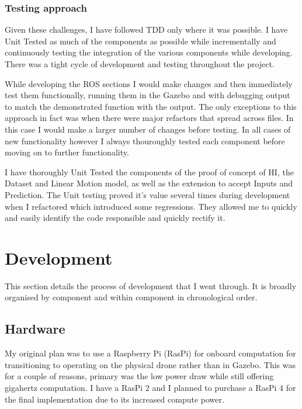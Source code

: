 \documentclass[]{../resources/final_report}
\begin{document}
\subsubsection{Testing approach}

Given these challenges, I have followed TDD only where it was possible. I have Unit Tested as much of the components as possible while incrementally and continuously testing the integration of the various components while developing. There was a tight cycle of development and testing throughout the project.

While developing the ROS sections I would make changes and then immediately test them functionally, running them in the Gazebo and with debugging output to match the demonstrated function with the output.
The only exceptions to this approach in fact was when there were major refactors that spread across files. In this case I would make a larger number of changes before testing. In all cases of new functionality however I always thouroughly tested each component before moving on to further functionality.

I have thoroughly Unit Tested the components of the proof of concept of HI, the Dataset and Linear Motion model, as well as the extension to accept Inputs and Prediction. The Unit testing proved it's value several times during development when I refactored which introduced some regressions. They allowed me to quickly and easily identify the code responsible and quickly rectify it.

\section{Development}

This section details the process of development that I went through. It is broadly organised by component and within component in chronological order.

\subsection{Hardware}

My original plan was to use a Raspberry Pi (RasPi) for onboard computation for transitioning to operating on the physical drone rather than in Gazebo. This was for a couple of reasons, primary was the low power draw while still offering gigahertz computation. I have a RasPi 2 and I planned to purchase a RasPi 4 for the final implementation due to its increased compute power.
\end{document}
